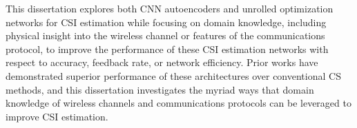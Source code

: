 This dissertation explores both CNN autoencoders and unrolled optimization networks for CSI estimation while focusing on domain knowledge, including physical insight into the wireless channel or features of the communications protocol, to improve the performance of these CSI estimation networks with respect to accuracy, feedback rate, or network efficiency. Prior works have demonstrated superior performance of these architectures over conventional CS methods, and this dissertation investigates the myriad ways that domain knowledge of wireless channels and communications protocols can be leveraged to improve CSI estimation.

